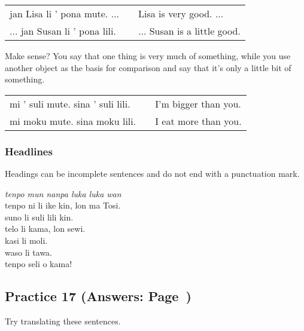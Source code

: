 \begin{supertabular}{p{5,5cm}|ll}
jan Lisa li ' pona mute. ...  && Lisa is very good. ... \\ %
... jan Susan li ' pona lili. && ... Susan is a little good. \\ %
\end{supertabular} 

Make sense? 
You say that one thing is very much of something, while you use another object as the basis for comparison and say that it's only a little bit of something. 

\begin{supertabular}{p{5,5cm}|ll}
mi ' suli mute. sina ' suli lili. && I'm bigger than you. \\
mi moku mute. sina moku lili. && I eat more than you. \\
\end{supertabular} 
%
\subsubsection*{Headlines} 
%
Headings can be incomplete sentences and do not end with a punctuation mark.

\textit{tenpo mun nanpa luka luka wan} \\
tenpo ni li ike kin, lon ma Tosi. \\
suno li suli lili kin. \\ 
telo li kama, lon sewi. \\
kasi li moli. \\
waso li tawa. \\
tenpo seli o kama! 

\subsection*{Practice 17 (Answers: Page~\pageref{'la'})}
%
Try translating these sentences.

